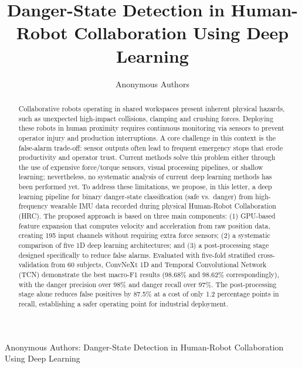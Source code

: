 \documentclass[letterpaper,journal]{IEEEtran}
\begin{document}
\title{Danger-State Detection in Human-Robot Collaboration Using Deep Learning}

\author{Anonymous Authors}

%
{Anonymous Authors: Danger-State Detection in Human-Robot Collaboration Using Deep Learning}

\maketitle

\begin{abstract}
    Collaborative robots operating in shared workspaces present inherent physical hazards, such as unexpected high-impact collisions, clamping and crushing forces. Deploying these robots in human proximity requires continuous monitoring via sensors to prevent operator injury and production interruptions. A core challenge in this context is the false-alarm trade-off: sensor outputs often lead to frequent emergency stops that erode productivity and operator trust. Current methods solve this problem either through the use of expensive force/torque sensors, visual processing pipelines, or shallow learning; nevertheless, no systematic analysis of current deep learning methods has been performed yet. To address these limitations, we propose, in this letter, a deep learning pipeline for binary danger-state classification (safe vs.\ danger) from high-frequency wearable IMU data recorded during physical Human-Robot Collaboration (HRC). The proposed approach is based on three main components: (1) GPU-based feature expansion that computes velocity and acceleration from raw position data, creating 195 input channels without requiring extra force sensors; (2) a systematic comparison of five 1D deep learning architectures; and (3) a post-processing stage designed specifically to reduce false alarms. Evaluated with five-fold stratified cross-validation from 60 subjects, ConvNeXt 1D and Temporal Convolutional Network (TCN) demonstrate the best macro-F1 results (98.68\% and 98.62\% correspondingly), with the danger precision over 98\% and danger recall over 97\%. The post-processing stage alone reduces false positives by 87.5\% at a cost of only 1.2 percentage points in recall, establishing a safer operating point for industrial deployment.
\end{abstract}
\end{document}

